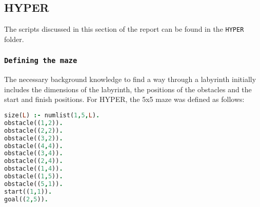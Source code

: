 \subsection{HYPER}
The scripts discussed in this section of the report can be found in the \texttt{HYPER} folder.\\

\subsubsection{\texttt{Defining the maze}}

The necessary background knowledge to find a way through a labyrinth initially includes the dimensions of the labyrinth, the positions of the obstacles and the start and finish positions. For HYPER, the 5x5 maze was defined as follows:
\begin{lstlisting}[label={lst:maze}, language=Prolog, caption=Definition of the maze, belowcaptionskip=1cm]
size(L) :- numlist(1,5,L).
obstacle((1,2)).
obstacle((2,2)).
obstacle((3,2)).
obstacle((4,4)).
obstacle((3,4)).
obstacle((2,4)).
obstacle((1,4)).
obstacle((1,5)).
obstacle((5,1)).
start((1,1)).
goal((2,5)).
\end{lstlisting}
